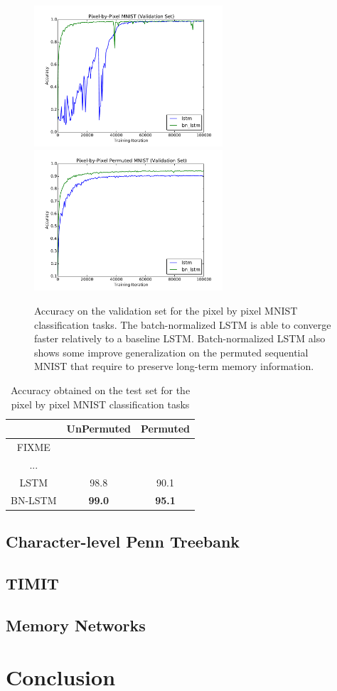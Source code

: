 \documentclass{article} %
\begin{document}
\begin{figure}
\center
\includegraphics[width=7cm]{figures/unpermuted_valid.pdf}
\includegraphics[width=7cm]{figures/permuted_valid.pdf}
\caption{Accuracy on the validation set for the pixel by pixel MNIST classification tasks. The batch-normalized LSTM is able to converge faster relatively to a baseline LSTM.
  Batch-normalized  LSTM also shows some improve generalization on the permuted sequential MNIST that require to preserve long-term memory information.}
\label{fig:seqmnist_valid}
\end{figure}


\begin{table}
\center
\begin{tabular}{c|c|c}
  \hline
  & UnPermuted & Permuted\\
  \hline
  FIXME & & \\
  ... & &\\
  \hline
  LSTM & 98.8 & 90.1\\
  BN-LSTM & \textbf{99.0} & \textbf{95.1}\\
\end{tabular}
\caption{Accuracy obtained on the test set for the pixel by pixel MNIST classification tasks}
\label{tab:seqmnist_test}

\end{table}

\subsection{Character-level Penn Treebank}

\subsection{TIMIT}

\subsection{Memory Networks}

\section{Conclusion}


\end{document}
